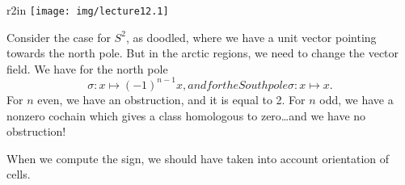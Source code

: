\begin{wrapfigure}[13]{r}{2in}
  \vspace{-20pt}
    \texttt{[image: img/lecture12.1]}
  \vspace{-20pt}
\end{wrapfigure}

Consider the case for $S^{2}$, as doodled, where we have a unit
vector pointing towards the north pole. But in the arctic
regions, we need to change the vector field. We have for the
north pole
\begin{subequations}
\begin{equation}
\sigma\colon x\mapsto (-1)^{n-1}x,
\end{equation}
and for the South pole
\begin{equation}
\sigma\colon x\mapsto x.
\end{equation}
\end{subequations}
For $n$ even, we have an obstruction, and it is equal to 2. For
$n$ odd, we have a nonzero cochain which gives a class homologous
to zero\dots and we have no obstruction!
\medbreak

When we compute the sign, we should have taken into account
orientation of cells.
